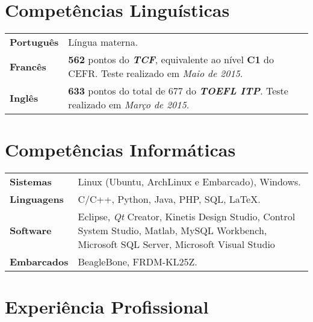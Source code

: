 \documentclass[10pt, a4paper]{article}
\begin{document}



\section{Competências Linguísticas}

\begin{tabular}{p{} p{}}

\textbf{Português} & Língua materna.  \\

\textbf{Francês} & \textbf{562} pontos do \textbf{\textit{TCF}},
equivalente ao nível \textbf{C1} do CEFR. Teste realizado em \textit{Maio
de 2015}.\\

\textbf{Inglês} & \textbf{633} pontos do total de 677 do \textbf{\textit{TOEFL
ITP}}. Teste realizado em \textit{Março de 2015}. \\

\end{tabular}


\section{Competências Informáticas}

\begin{tabular}{p{} p{}}

\textbf{Sistemas} & Linux (Ubuntu, ArchLinux e Embarcado), Windows.  \\

\textbf{Linguagens} & C/C++, Python, Java, PHP,  SQL, \LaTeX.  \\

\textbf{Software} & Eclipse, \textit{Qt} Creator, Kinetis Design Studio,
Control System Studio, Matlab, MySQL Workbench, Microsoft SQL Server, Microsoft
Visual Studio\\

\textbf{Embarcados} & BeagleBone, FRDM-KL25Z. \\

\end{tabular}



\section{Experiência Profissional}
\end{document}
